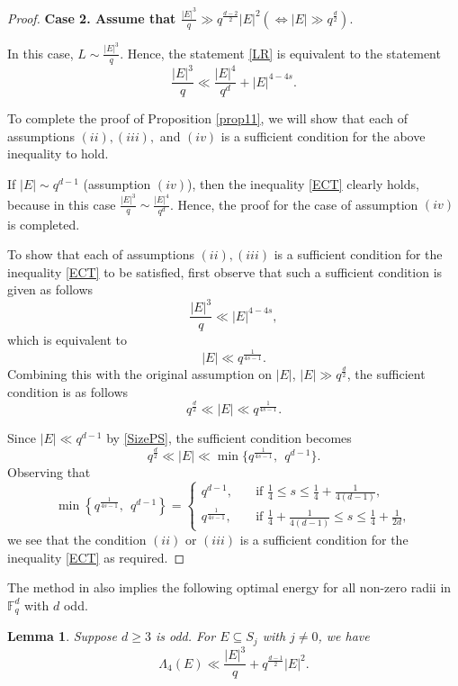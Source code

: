 \documentclass[11pt]{article}
\newtheorem{lemma}[theorem]{Lemma}
\begin{document}
\begin{proof}
\textbf{Case 2. Assume that $\frac{|E|^3}{q} \gg q^{\frac{d-2}{2}}|E|^2 (\iff |E| \gg q^{\frac{d}{2}})$}.

In this case,   $L\sim \frac{|E|^3}{q}$.   Hence,  the statement \eqref{LR}  is equivalent to the statement
\begin{equation}\label{ECT} \frac{|E|^3}{q}  \ll  \frac{|E|^4}{q^d}+ |E|^{4-4s}.\end{equation}

To complete the proof of Proposition \ref{prop11},  we will show that  each of assumptions $(ii), (iii),$ and $(iv)$ is a sufficient condition for the above inequality to hold.

If $|E|\sim q^{d-1}$ (assumption $(iv)$), then the inequality \eqref{ECT} clearly holds, because in this case $\frac{|E|^3}{q}\sim \frac{|E|^4}{q^d}$.
Hence,  the proof for the case of assumption $(iv)$ is completed.

To show that each of assumptions $(ii), (iii)$ is a sufficient condition for the inequality \eqref{ECT} to be satisfied, first observe that such a sufficient condition is given as follows $$\frac{|E|^3}{q} \ll |E|^{4-4s},$$
which is equivalent to 
$$ |E|\ll q^{\frac{1}{4s-1}}.$$
Combining this with the original assumption on $|E|$, $|E|\gg q^{\frac{d}{2}}$, the sufficient condition is as follows
$$  q^{\frac{d}{2}} \ll |E|\ll q^{\frac{1}{4s-1}}.$$

Since $|E|\ll q^{d-1}$ by \eqref{SizePS}, the sufficient condition becomes
$$  q^{\frac{d}{2}} \ll |E|\ll \min\{q^{\frac{1}{4s-1}},  ~~q^{d-1}\}.$$
Observing that 
\[ \min\left\{q^{\frac{1}{4s-1}},  ~~q^{d-1}\right\} = \begin{cases}
    q^{d-1}, \quad                  &\text{if } \frac{1}{4} \le s \le \frac{1}{4}+\frac{1}{4(d-1)},\\
     q^{\frac{1}{4s-1}}, \quad     & \text{if }  \frac{1}{4}+\frac{1}{4(d-1)} \le s \le \frac{1}{4}+ \frac{1}{2d}, 
    \end{cases}\]
we see that the condition $(ii)$ or $(iii)$ is a sufficient condition for the inequality \eqref{ECT} as required.
\end{proof}





The method in \cite{KPV2021} also implies the following optimal energy for all non-zero radii in $\mathbb{F}_q^d$ with $d$ odd.
\begin{lemma}\label{lemma2.6}
Suppose $d\ge 3$ is odd. For $E \subseteq S_j$ with $j\ne 0$, we have
\[
\Lambda_4(E) \ll \frac{|E|^3}{q} + q^{\frac{d-1}{2}}|E|^2.
\]
\end{lemma}
\end{document}

